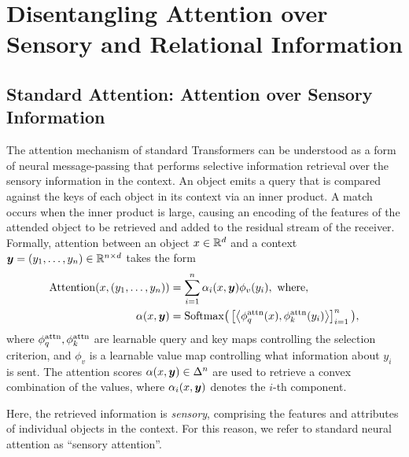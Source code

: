 \section{Disentangling Attention over Sensory and Relational Information}

\subsection{Standard Attention: Attention over Sensory Information}


The attention mechanism of standard Transformers can be understood as a form of neural message-passing that performs selective information retrieval over the sensory information in the context. An object emits a query that is compared against the keys of each object in its context via an inner product. A match occurs when the inner product is large, causing an encoding of the features of the attended object to be retrieved and added to the residual stream of the receiver. Formally, attention between an object $x \in \mathbb{R}^d$ and a context $\bm{y} = (y_1, \ldots, y_n) \in \mathbb{R}^{n \times d}$ takes the form
\begin{equation}\label{eq:self_attn}
  \begin{split}
    \Attn(x, \ys) &= \sum_{i=1}^{n} \alpha_i(x, \y) \phi_v(y_i), \ \text{where}, \\
    \alpha(x, \y) &= \Softmax\bigparen{\bra{\iprod{\phiqattn(x)}{\phikattn(y_i)}}_{i=1}^{n}},
  \end{split}
\end{equation}
where $\phi_q^{\mathrm{attn}},\phi_k^{\mathrm{attn}}$ are learnable query and key maps controlling the selection criterion, and $\phi_v$ is a learnable value map controlling what information about $y_i$ is sent. The attention scores $\alpha(x, \bm{y}) \in \Delta^n$ are used to retrieve a convex combination of the values, where $\alpha_i(x, \bm{y})$ denotes the $i$-th component.

Here, the retrieved information is \textit{sensory}, comprising the features and attributes of individual objects in the context. For this reason, we refer to standard neural attention as ``sensory attention''.


